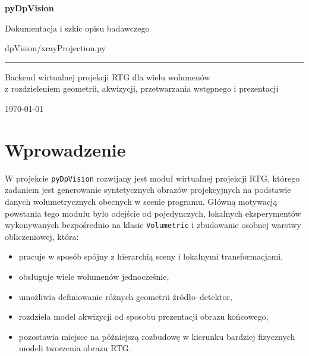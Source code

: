 \documentclass[12pt,a4paper]{article}
\begin{document}
\begin{titlepage}
  \centering
  \vspace*{2.8cm}
  {\LARGE\bfseries pyDpVision\par}
  \vspace{0.6cm}
  {\large Dokumentacja i szkic opisu badawczego\par}
  \vspace{0.4cm}
  {\huge\ttfamily dpVision/xrayProjection.py\par}
  \vspace{0.8cm}
  \rule{0.72\textwidth}{0.4pt}
  \vspace{0.6cm}

  {\large Backend wirtualnej projekcji RTG dla wielu wolumenów\\
  z rozdzieleniem geometrii, akwizycji, przetwarzania wstępnego i prezentacji\par}

  \vfill
  {\small \today}
\end{titlepage}

\tableofcontents
\newpage

\section{Wprowadzenie}

W projekcie \texttt{pyDpVision} rozwijany jest moduł wirtualnej projekcji RTG,
którego zadaniem jest generowanie syntetycznych obrazów projekcyjnych na podstawie
danych wolumetrycznych obecnych w scenie programu. Główną motywacją powstania tego
modułu było odejście od pojedynczych, lokalnych eksperymentów wykonywanych
bezpośrednio na klasie \texttt{Volumetric} i zbudowanie osobnej warstwy
obliczeniowej, która:
\begin{itemize}
  \item pracuje w sposób spójny z hierarchią sceny i lokalnymi transformacjami,
  \item obsługuje wiele wolumenów jednocześnie,
  \item umożliwia definiowanie różnych geometrii źródło--detektor,
  \item rozdziela model akwizycji od sposobu prezentacji obrazu końcowego,
  \item pozostawia miejsce na późniejszą rozbudowę w kierunku bardziej fizycznych
        modeli tworzenia obrazu RTG.
\end{itemize}
\end{document}
